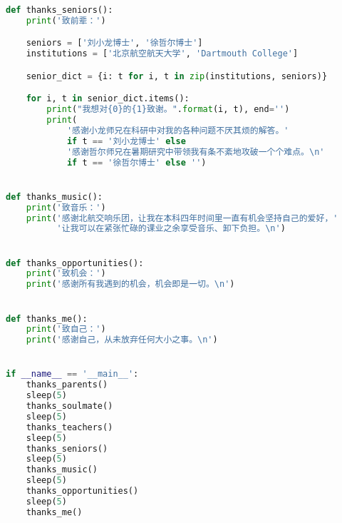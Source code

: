 \begin{lstlisting}[language=Python, frame=none]
def thanks_seniors():
    print('致前辈：')

    seniors = ['刘小龙博士', '徐哲尔博士']
    institutions = ['北京航空航天大学', 'Dartmouth College']

    senior_dict = {i: t for i, t in zip(institutions, seniors)}

    for i, t in senior_dict.items():
        print("我想对{0}的{1}致谢。".format(i, t), end='')
        print(
            '感谢小龙师兄在科研中对我的各种问题不厌其烦的解答。' 
            if t == '刘小龙博士' else
            '感谢哲尔师兄在暑期研究中带领我有条不紊地攻破一个个难点。\n' 
            if t == '徐哲尔博士' else '')


def thanks_music():
    print('致音乐：')
    print('感谢北航交响乐团，让我在本科四年时间里一直有机会坚持自己的爱好，'
          '让我可以在紧张忙碌的课业之余享受音乐、卸下负担。\n')


def thanks_opportunities():
    print('致机会：')
    print('感谢所有我遇到的机会，机会即是一切。\n')


def thanks_me():
    print('致自己：')
    print('感谢自己，从未放弃任何大小之事。\n')


if __name__ == '__main__':
    thanks_parents()
    sleep(5)
    thanks_soulmate()
    sleep(5)
    thanks_teachers()
    sleep(5)
    thanks_seniors()
    sleep(5)
    thanks_music()
    sleep(5)
    thanks_opportunities()
    sleep(5)
    thanks_me()
    
\end{lstlisting}
\cleardoublepage
